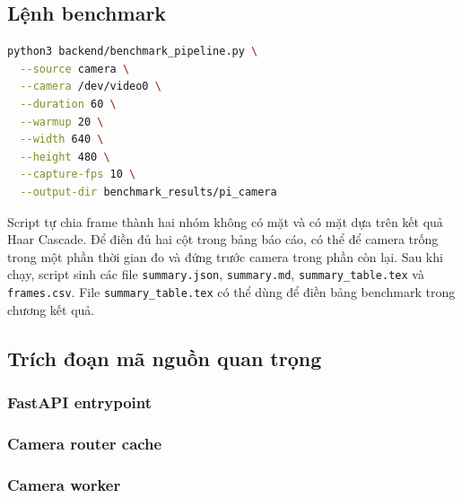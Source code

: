 \subsection{Lệnh benchmark}

\begin{lstlisting}[language=bash, caption={Benchmark pipeline trên thiết bị edge}, label={lst:benchmark_run}]
python3 backend/benchmark_pipeline.py \
  --source camera \
  --camera /dev/video0 \
  --duration 60 \
  --warmup 20 \
  --width 640 \
  --height 480 \
  --capture-fps 10 \
  --output-dir benchmark_results/pi_camera
\end{lstlisting}

Script tự chia frame thành hai nhóm không có mặt và có mặt dựa trên kết quả Haar Cascade. Để điền đủ hai cột trong bảng báo cáo, có thể để camera trống trong một phần thời gian đo và đứng trước camera trong phần còn lại. Sau khi chạy, script sinh các file \texttt{summary.json}, \texttt{summary.md}, \texttt{summary\_table.tex} và \texttt{frames.csv}. File \texttt{summary\_table.tex} có thể dùng để điền bảng benchmark trong chương kết quả.

\subsection{Trích đoạn mã nguồn quan trọng}

\subsubsection{FastAPI entrypoint}


\subsubsection{Camera router cache}


\subsubsection{Camera worker}


